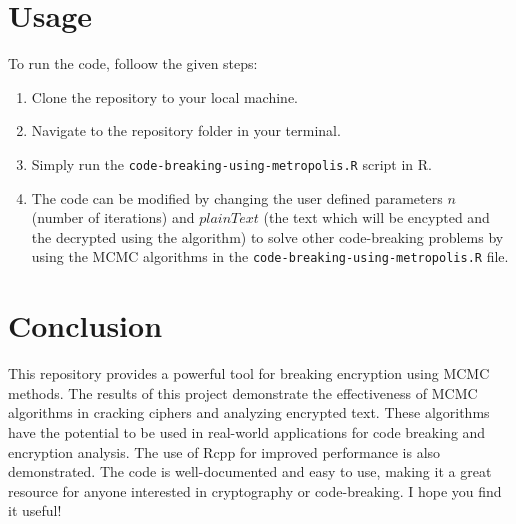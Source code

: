 \documentclass{article}
\begin{document}
\section{Usage}

To run the code, folloow the given steps:

\begin{enumerate}
    \item Clone the repository to your local machine.
    \item Navigate to the repository folder in your terminal.
    \item Simply run the  \texttt{code-breaking-using-metropolis.R} script in R.
    \item The code can be modified by changing the user defined parameters $n$ (number of iterations) and  $plainText$ (the text which will be encypted and the decrypted using the algorithm) to solve other code-breaking problems by using the MCMC algorithms in the \texttt{code-breaking-using-metropolis.R} file.
    
\end{enumerate}

\section{Conclusion}

This repository provides a powerful tool for breaking encryption using MCMC methods.  
The results of this project demonstrate the effectiveness of MCMC algorithms in cracking ciphers and analyzing encrypted text. These algorithms have the potential to be used in real-world applications for code breaking and encryption analysis. The use of Rcpp for improved performance is also demonstrated.
\newline
The code is well-documented and easy to use, making it a great resource for anyone interested in cryptography or code-breaking. I hope you find it useful!
\end{document}
